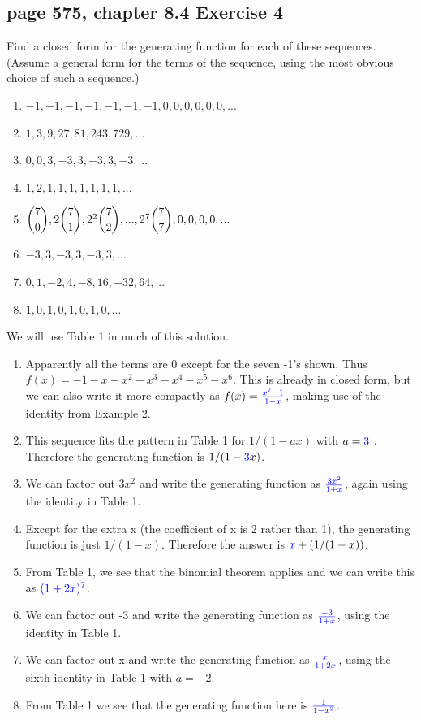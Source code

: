 \documentclass[sigconf]{acmart}
\newcommand{\answer}[2]{%
  \if\relax\detokenize{#2}\relax
    \underline{\mbox{請作答}}%
  \else
    \textcolor{blue}{#2}%
  \fi
}
\begin{document}
\subsection{page 575, chapter 8.4 Exercise 4}
\begin{shaded}
    Find a closed form for the generating function for each of these sequences. (Assume a general form for the terms of the sequence, using the most obvious choice of such a sequence.)
    \begin{enumerate}[label=(\alph*)]
        \item $-1, -1, -1, -1, -1, -1, -1, 0, 0, 0, 0, 0, 0, ...$
        \item $1, 3, 9, 27, 81, 243, 729, ...$
        \item $0, 0, 3, -3, 3, -3, 3, -3, ...$
        \item $1, 2, 1, 1, 1, 1, 1, 1, 1, ...$
        \item $\dbinom{7}{0}, 2\dbinom{7}{1}, 2^2\dbinom{7}{2}, ..., 2^7\dbinom{7}{7}, 0, 0, 0, 0, ...$
        \item $-3, 3, -3, 3, -3, 3, ...$
        \item $0, 1, -2, 4, -8, 16, -32, 64, ...$
        \item $1, 0, 1, 0, 1, 0, 1, 0, ...$
    \end{enumerate}
\end{shaded}
We will use Table 1 in much of this solution.
\begin{enumerate}[label=(\alph*)]
        \item Apparently all the terms are 0 except for the seven -1’s shown. Thus $f(x) = -1 -x -x^2 -x^3 -x^4 -x^5 -x^6$. This is already in closed form, but we can also write it more compactly as $f(x) = \answer{8.4.4a}{\frac{x^7-1}{1-x}}$, making use of the identity from Example 2.
        \item This sequence fits the pattern in Table 1 for $1/(1 - ax)$ with $a = \answer{8.4.4b}{3}$ . Therefore the generating function is $1/(1 - \answer{8.4.4c}{3}x)$.
        \item We can factor out $3x^2$ and write the generating function as $\answer{8.4.4d}{\frac{3x^2}{1+x}}$, again using the identity in Table 1.
        \item Except for the extra x (the coefficient of x is 2 rather than 1), the generating function is just $1/(1 - x)$. Therefore the answer is $ \answer{8.4.4e}{x} + (1/(1 - x))$.
        \item From Table 1, we see that the binomial theorem applies and we can write this as $\answer{8.4.4f}{(1+2x)^7}$.
        \item We can factor out -3 and write the generating function as $\answer{8.4.4g}{\frac{-3}{1+x}}$, using the identity in Table 1.
        \item We can factor out x and write the generating function as $\answer{8.4.4h}{\frac{x}{1+2x}}$, using the sixth identity in Table 1 with $a = -2$.
        \item From Table 1 we see that the generating function here is $\answer{8.4.4i}{\frac{1}{1-x^2}}$.
\end{enumerate}
\end{document}
